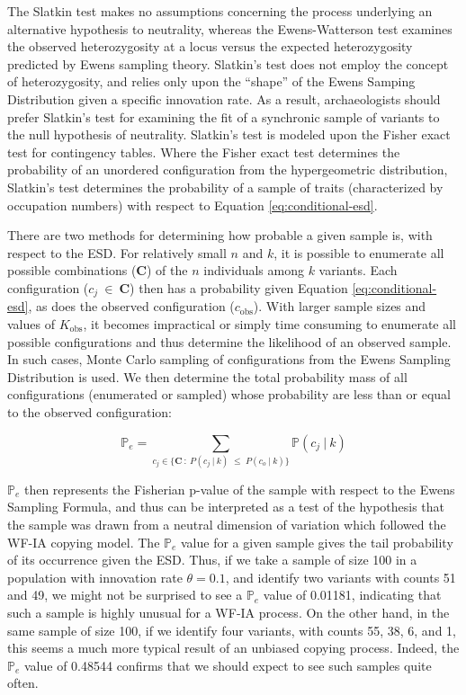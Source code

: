 The Slatkin test makes no assumptions concerning the process underlying an alternative hypothesis to neutrality, whereas the Ewens-Watterson test examines the observed heterozygosity at a locus versus the expected heterozygosity predicted by Ewens sampling theory.  Slatkin's test does not employ the concept of heterozygosity, and relies only upon the ``shape'' of the Ewens Samping Distribution given a specific innovation rate.  As a result, archaeologists should prefer Slatkin's test for examining the fit of a synchronic sample of variants to the null hypothesis of neutrality.  Slatkin's test is modeled upon the Fisher exact test for contingency tables.  Where the Fisher exact test determines the probability of an unordered configuration from the hypergeometric distribution, Slatkin's test determines the probability of a sample of traits (characterized by occupation numbers) with respect to Equation \ref{eq:conditional-esd}.  

There are two methods for determining how probable a given sample is, with respect to the ESD.  For relatively small $n$ and $k$, it is possible to enumerate all possible combinations ($\mathbf{C}$) of the $n$ individuals among $k$ variants.  Each configuration ($c_j \: \in \: \mathbf{C}$) then has a probability given Equation \ref{eq:conditional-esd}, as does the observed configuration ($c_{\text{obs}}$).   With larger sample sizes and values of $K_{\text{obs}}$, it becomes impractical or simply time consuming to enumerate all possible configurations and thus determine the likelihood of an observed sample.  In such cases, Monte Carlo sampling of configurations from the Ewens Sampling Distribution is used.  We then determine the total probability mass of all configurations (enumerated or sampled) whose probability are less than or equal to the observed configuration:

\begin{equation}
\label{eq:slatkin-pe}
\mathbb{P}_e = \sum_{c_j \in \lbrace \mathbf{C} \: : \:  P(c_j \: | \: k) \; \leq \; P(c_o \: | \: k)\rbrace} \mathbb{P}(c_j \: | \: k)
\end{equation}

$\mathbb{P}_e$ then represents the Fisherian p-value of the sample with respect to the Ewens Sampling Formula, and thus can be interpreted as a test of the hypothesis that the sample was drawn from a neutral dimension of variation which followed the WF-IA copying model.  The $\mathbb{P}_e$ value for a given sample gives the tail probability of its occurrence given the ESD.  Thus, if we take a sample of size 100 in a population with innovation rate $\theta =  0.1$, and identify two variants with counts 51 and 49, we might not be surprised to see a $\mathbb{P}_e$ value of 0.01181, indicating that such a sample is highly unusual for a WF-IA process.  On the other hand, in the same sample of size 100, if we identify four variants, with counts 55, 38, 6, and 1, this seems a much more typical result of an unbiased copying process.  Indeed, the $\mathbb{P}_e$ value of 0.48544 confirms that we should expect to see such samples quite often. 


